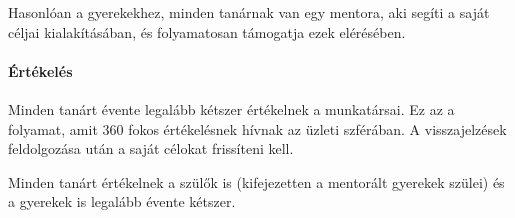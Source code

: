 Hasonlóan a gyerekekhez, minden tanárnak van egy mentora, aki segíti a saját
céljai kialakításában, és folyamatosan támogatja ezek elérésében.

\paragraph{Értékelés}

Minden tanárt évente legalább kétszer értékelnek a munkatársai. Ez az a folyamat,
amit 360 fokos értékelésnek hívnak az üzleti szférában. A visszajelzések
feldolgozása után a saját célokat frissíteni kell.

Minden tanárt értékelnek a szülők is (kifejezetten a mentorált gyerekek szülei)
és a gyerekek is legalább évente kétszer.
